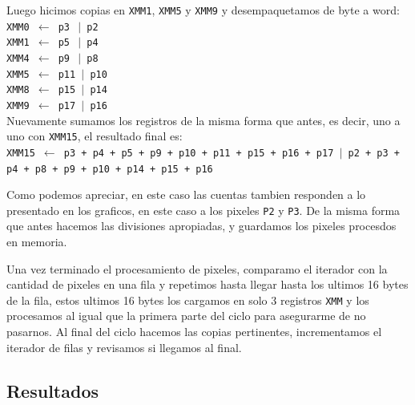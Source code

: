 Luego hicimos copias en \texttt{XMM1}, \texttt{XMM5} y \texttt{XMM9} y desempaquetamos de byte a word:\\

\noindent
\texttt{XMM0 $\gets$ p3 $\ \vert$ p2}\\
\texttt{XMM1 $\gets$ p5 $\ \vert$ p4}\\
\texttt{XMM4 $\gets$ p9 $\ \vert$ p8}\\
\texttt{XMM5 $\gets$ p11 $\vert$ p10}\\
\texttt{XMM8 $\gets$ p15 $\vert$ p14}\\
\texttt{XMM9 $\gets$ p17 $\vert$ p16}\\

Nuevamente sumamos los registros de la misma forma que antes, es decir, uno a uno con \texttt{XMM15}, el resultado final es:\\

\noindent
\texttt{XMM15 $\gets$ p3 + p4 + p5 + p9 + p10 + p11 + p15 + p16 + p17 $\vert$ p2 + p3 + p4 + p8 + p9 + p10 + p14 + p15 + p16}

Como podemos apreciar, en este caso las cuentas tambien responden a lo presentado en los graficos, en este caso a los pixeles \texttt{P2} y \texttt{P3}. De la misma forma que antes hacemos las divisiones apropiadas, y guardamos los pixeles procesdos en memoria.

Una vez terminado el procesamiento de pixeles, comparamo el iterador con la cantidad de pixeles en una fila y repetimos hasta llegar hasta los ultimos 16 bytes de la fila, estos ultimos 16 bytes los cargamos en solo 3 registros \texttt{XMM} y los procesamos al igual que la primera parte del ciclo para asegurarme de no pasarnos. Al final del ciclo hacemos las copias pertinentes, incrementamos el iterador de filas y revisamos si llegamos al final. \\

\subsection{Resultados}



